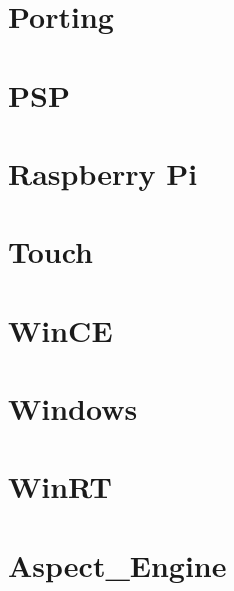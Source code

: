 \documentclass[twoside]{book}
\newcommand{\+}{\discretionary{\mbox{\scriptsize$\hookleftarrow$}}{}{}}
\begin{document}
\chapter{Porting}
\label{md__contrib__s_d_l2-2_80_88_docs__r_e_a_d_m_e-porting}

\chapter{P\+SP}
\label{md__contrib__s_d_l2-2_80_88_docs__r_e_a_d_m_e-psp}

\chapter{Raspberry Pi}
\label{md__contrib__s_d_l2-2_80_88_docs__r_e_a_d_m_e-raspberrypi}

\chapter{Touch}
\label{md__contrib__s_d_l2-2_80_88_docs__r_e_a_d_m_e-touch}

\chapter{Win\+CE}
\label{md__contrib__s_d_l2-2_80_88_docs__r_e_a_d_m_e-wince}

\chapter{Windows}
\label{md__contrib__s_d_l2-2_80_88_docs__r_e_a_d_m_e-windows}

\chapter{Win\+RT}
\label{md__contrib__s_d_l2-2_80_88_docs__r_e_a_d_m_e-winrt}

\chapter{Aspect\+\_\+\+Engine}
\label{md__r_e_a_d_m_e}

\end{document}
